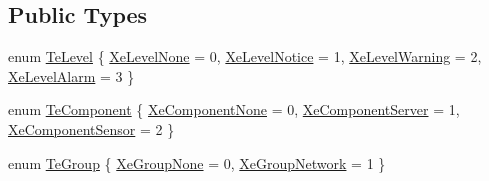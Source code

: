 \subsection*{Public Types}
\begin{DoxyCompactItemize}
\item 
enum \mbox{\hyperlink{class_g_n_common_1_1_g_tc_alert_a9ef9363f62aae79a7323005ab126507e}{Te\+Level}} \{ \mbox{\hyperlink{class_g_n_common_1_1_g_tc_alert_a9ef9363f62aae79a7323005ab126507eae3bf0642bc4457afb752f6f41a507d86}{Xe\+Level\+None}} = 0, 
\mbox{\hyperlink{class_g_n_common_1_1_g_tc_alert_a9ef9363f62aae79a7323005ab126507eacebd57948648fe7897a9f0e5bb091b31}{Xe\+Level\+Notice}} = 1, 
\mbox{\hyperlink{class_g_n_common_1_1_g_tc_alert_a9ef9363f62aae79a7323005ab126507eaf9a9623077a914bb1b9fc28183670765}{Xe\+Level\+Warning}} = 2, 
\mbox{\hyperlink{class_g_n_common_1_1_g_tc_alert_a9ef9363f62aae79a7323005ab126507ea7a378abd7d3362d4e0677adb5af49bbf}{Xe\+Level\+Alarm}} = 3
 \}
\item 
enum \mbox{\hyperlink{class_g_n_common_1_1_g_tc_alert_aec0a7908321c01ae225df4908d7f3fa0}{Te\+Component}} \{ \mbox{\hyperlink{class_g_n_common_1_1_g_tc_alert_aec0a7908321c01ae225df4908d7f3fa0ab675dd902eb07ebb108c78de28abfc00}{Xe\+Component\+None}} = 0, 
\mbox{\hyperlink{class_g_n_common_1_1_g_tc_alert_aec0a7908321c01ae225df4908d7f3fa0a03e5a94b7c7c39ffa6b7461800a2fa7a}{Xe\+Component\+Server}} = 1, 
\mbox{\hyperlink{class_g_n_common_1_1_g_tc_alert_aec0a7908321c01ae225df4908d7f3fa0a6966d846ba577a7db9225222b7b57235}{Xe\+Component\+Sensor}} = 2
 \}
\item 
enum \mbox{\hyperlink{class_g_n_common_1_1_g_tc_alert_a2deb7f82fcf5d88b4e10d74fa6c28cb7}{Te\+Group}} \{ \mbox{\hyperlink{class_g_n_common_1_1_g_tc_alert_a2deb7f82fcf5d88b4e10d74fa6c28cb7a8c11493234d6ebc2d5654bbbc738be92}{Xe\+Group\+None}} = 0, 
\mbox{\hyperlink{class_g_n_common_1_1_g_tc_alert_a2deb7f82fcf5d88b4e10d74fa6c28cb7a51d90a061a469018e2d235d5919a3ab9}{Xe\+Group\+Network}} = 1
 \}
\end{DoxyCompactItemize}
